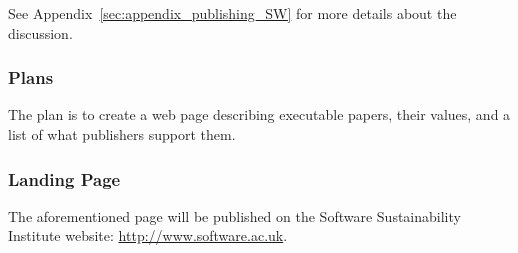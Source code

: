 See Appendix~\ref{sec:appendix_publishing_SW} for more details about the
discussion.

\subsubsection{Plans}

The plan is to create a web page describing executable papers, their values, and
a list of what publishers support them. 

\subsubsection{Landing Page}

The aforementioned page will be published on the Software Sustainability
Institute website: \url{http://www.software.ac.uk}.
